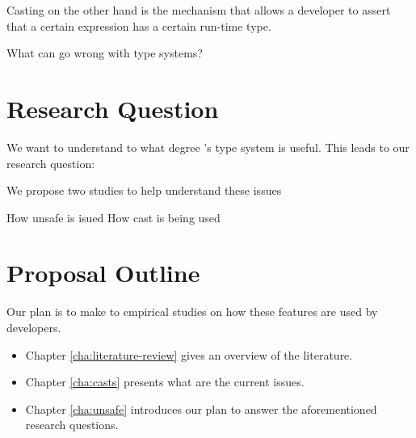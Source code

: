 Casting on the other hand is the mechanism that allows a developer to assert that a certain expression has a certain run-time type.

What can go wrong with type systems?




\section{Research Question}

We want to understand to what degree \java{}'s type system is useful.
This leads to our research question:


We propose two studies to help understand these issues

How unsafe is isued
How cast is being used

\section{Proposal Outline}

Our plan is to make to empirical studies on how these features are used by developers.

\begin{itemize}
\item Chapter \ref{cha:literature-review} gives an overview of the literature.
\item Chapter \ref{cha:casts} presents what are the current issues.
\item Chapter \ref{cha:unsafe} introduces our plan to answer the aforementioned research questions.
\end{itemize}
